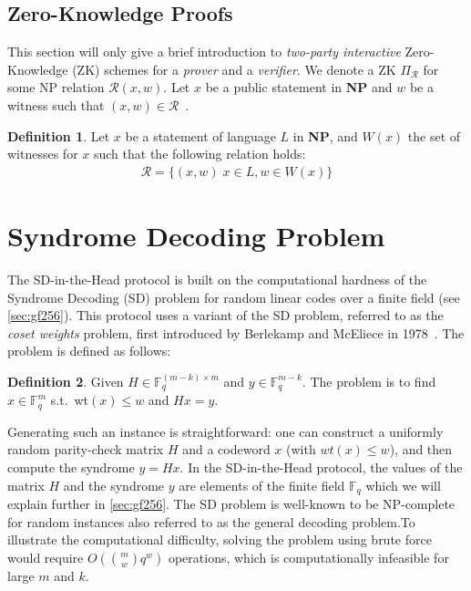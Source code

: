 \documentclass[twoside,11pt,openright]{report}
\theoremstyle{definition}
\newtheorem{definition}{Definition}[section]
\theoremstyle{plain}
\begin{document}
\subsection{Zero-Knowledge Proofs}\label{sec:zk}
This section will only give a brief introduction to \textit{two-party interactive} Zero-Knowledge (ZK) schemes for a \textit{prover} and a \textit{verifier}. We denote a ZK $\Pi_{\mathcal{R}}$ for some NP relation $\mathcal{R}(x, w)$. Let $x$ be a public statement in \textbf{NP} and $w$ be a witness such that $(x, w) \in \mathcal{R}$~\cite{feneuil2023threshold}.

\begin{definition}
  Let $x$ be a statement of language $L$ in \textbf{NP}, and $W(x)$ the set of witnesses for $x$ such that the following relation holds:
  \begin{align*}
    \mathcal{R} = \{(x, w)\; x \in L, w \in W(x)\}
  \end{align*}
\end{definition}

\section{Syndrome Decoding Problem}\label{sec:syndrome}

The SD-in-the-Head protocol is built on the computational hardness of the Syndrome Decoding (SD) problem for random linear codes over a finite field (see \autoref{sec:gf256}). This protocol uses a variant of the SD problem, referred to as the \textit{coset weights} problem, first introduced by Berlekamp and McEliece in 1978~\cite{berlekamp1978inherent}. The problem is defined as follows:
\begin{definition}\label{def:syndrome}
  Given $H \in \mathbb{F}^{(m-k)\times m}_q$ and $y \in \mathbb{F}^{m-k}_q$. The problem is to find $x \in \mathbb{F}^m_q$ s.t.\ wt$(x) \leq w$ and $Hx = y$.
\end{definition}
Generating such an instance is straightforward: one can construct a uniformly random parity-check matrix $H$ and a codeword $x$ (with $wt(x) \leq w$), and then compute the syndrome $y = Hx$. In the SD-in-the-Head protocol, the values of the matrix $H$ and the syndrome $y$ are elements of the finite field $\mathbb{F}_q$ which we will explain further in \autoref{sec:gf256}. The SD problem is well-known to be NP-complete for random instances \cite{berlekamp1978inherent} also referred to as the general decoding problem.To illustrate the computational difficulty, solving the problem using brute force would require $O(\binom{m}{w} q^w)$ operations, which is computationally infeasible for large $m$ and $k$.
\end{document}
